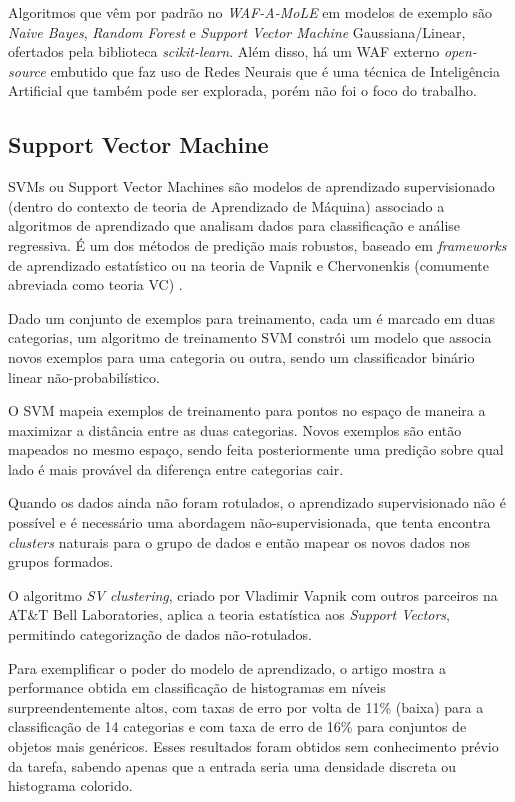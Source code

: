 Algoritmos que vêm por padrão no \textit{WAF-A-MoLE} em modelos de exemplo são \textit{Naive Bayes}, \textit{Random Forest} e \textit{Support Vector Machine} Gaussiana/Linear, ofertados pela biblioteca \textit{scikit-learn}. Além disso, há um WAF externo \textit{open-source} embutido que faz uso de Redes Neurais que é uma técnica de Inteligência Artificial que também pode ser explorada, porém não foi o foco do trabalho.

\subsection{Support Vector Machine}
SVMs ou Support Vector Machines são modelos de aprendizado supervisionado (dentro do contexto de teoria de Aprendizado de Máquina) associado a algoritmos de aprendizado que analisam dados para classificação e análise regressiva. É um dos métodos de predição mais robustos, baseado em \textit{frameworks} de aprendizado estatístico ou na teoria de Vapnik e Chervonenkis (comumente abreviada como teoria VC) \cite{ben2001_vapnik_support}.

Dado um conjunto de exemplos para treinamento, cada um é marcado em duas categorias, um algoritmo de treinamento SVM constrói um modelo que associa novos exemplos para uma categoria ou outra, sendo um classificador binário linear não-probabilístico. 
 
O SVM mapeia exemplos de treinamento para pontos no espaço de maneira a maximizar a distância entre as duas categorias. Novos exemplos são então mapeados no mesmo espaço, sendo feita posteriormente uma predição sobre qual lado é mais provável da diferença entre categorias cair. 

Quando os dados ainda não foram rotulados, o aprendizado supervisionado não é possível e é necessário uma abordagem não-supervisionada, que tenta encontra \textit{clusters} naturais para o grupo de dados e então mapear os novos dados nos grupos formados. 

O algoritmo \textit{SV clustering}, criado por Vladimir Vapnik com
outros parceiros na AT\&T Bell Laboratories, aplica a teoria estatística aos \textit{Support Vectors}, permitindo categorização de dados não-rotulados.

Para exemplificar o poder do modelo de aprendizado, o artigo \cite{vapnik_svm_support} mostra a performance obtida em classificação de histogramas em níveis surpreendentemente altos, com taxas de erro por volta de 11\% (baixa) para a classificação de 14 categorias e com taxa de erro de 16\% para conjuntos de objetos mais genéricos. Esses resultados foram obtidos sem conhecimento prévio da tarefa, sabendo apenas que a entrada seria uma densidade discreta ou histograma colorido.

